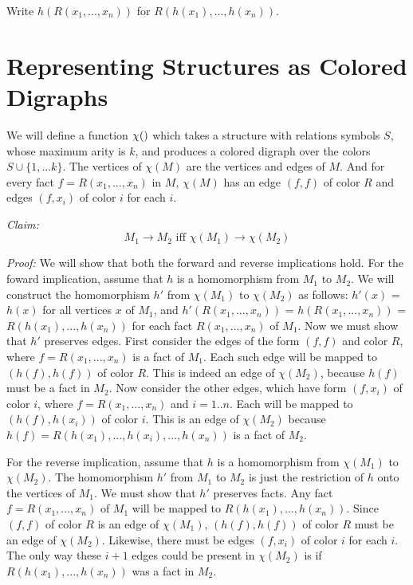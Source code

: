 \documentclass{article}
\newcommand{\union}{\cup}
\newcommand{\repr}[1]{\chi(#1)}
\newcommand{\homo}[2]{#1 \rightarrow #2}
\begin{document}
  Write $h(R(x_1, ..., x_n))$ for $R(h(x_1), ..., h(x_n))$.

\section{Representing Structures as Colored Digraphs}
  We will define a function $\repr$ which takes a structure with
  relations symbols $S$, whose maximum arity is $k$, and produces a
  colored digraph over the colors $S \union \{1, ... k\}$.  The
  vertices of $\repr{M}$ are the vertices and edges of $M$.  And for
  every fact $f = R(x_1, ..., x_n)$ in $M$, $\repr{M}$ has an edge
  $(f, f)$ of color $R$ and edges $(f, x_i)$ of color $i$ for each
  $i$.

  \emph{Claim:}
  \[\homo{M_1}{M_2} \mbox{ iff } \homo{\repr{M_1}}{\repr{M_2}} \]

  \emph{Proof:} We will show that both the forward and reverse
  implications hold.  For the foward implication, assume that $h$ is a
  homomorphism from $M_1$ to $M_2$.  We will construct the
  homomorphism $h'$ from $\repr{M_1}$ to $\repr{M_2}$ as follows:
  $h'(x)$ = $h(x)$ for all vertices $x$ of $M_1$, and $h'(R(x_1, ...,
  x_n))$ = $h(R(x_1, ..., x_n))$ = $R(h(x_1), ..., h(x_n))$ for each
  fact $R(x_1, ..., x_n)$ of $M_1$.  Now we must show that $h'$
  preserves edges.  First consider the edges of the form $(f, f)$ and
  color $R$, where $f = R(x_1, ..., x_n)$ is a fact of $M_1$.  Each
  such edge will be mapped to $(h(f), h(f))$ of color $R$.  This is
  indeed an edge of $\repr{M_2}$, because $h(f)$ must be a fact in
  $M_2$.  Now consider the other edges, which have form $(f, x_i)$ of
  color $i$, where $f = R(x_1, ..., x_n)$ and $i = 1..n$.  Each will
  be mapped to $(h(f), h(x_i))$ of color $i$.  This is an edge of
  $\repr{M_2}$ because $h(f) = R(h(x_1), ..., h(x_i), ..., h(x_n))$ is
  a fact of $M_2$.

  For the reverse implication, assume that $h$ is a homomorphism from
  $\repr{M_1}$ to $\repr{M_2}$.  The homomorphism $h'$ from $M_1$ to
  $M_2$ is just the restriction of $h$ onto the vertices of $M_1$.  We
  must show that $h'$ preserves facts.  Any fact $f = R(x_1, ...,
  x_n)$ of $M_1$ will be mapped to $R(h(x_1), ..., h(x_n))$.  Since
  $(f, f)$ of color $R$ is an edge of $\repr{M_1}$, $(h(f), h(f))$ of
  color $R$ must be an edge of $\repr{M_2}$.  Likewise, there must be
  edges $(f, x_i)$ of color $i$ for each $i$.  The only way these
  $i+1$ edges could be present in $\repr{M_2}$ is if $R(h(x_1), ...,
  h(x_n))$ was a fact in $M_2$.
\end{document}
